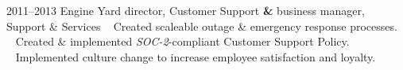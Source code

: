 \documentclass[]{friggeri-cv} %
\begin{document}

\section{{}{} {\normalsize{} ~~ }}

\begin{entrylist}
\entry
{2011--2013}
{Engine Yard}
{director, Customer Support \textbf{\&} business manager, Support \& Services}
{{\tiny {}} ~ Created scaleable outage \& emergency response processes.\\
{\tiny {}} ~ Created \& implemented \emph{SOC-2}-compliant Customer Support Policy. \\
{\tiny {}} ~ Implemented culture change to increase employee satisfaction and loyalty.\\

}
\end{entrylist}
\end{document}
